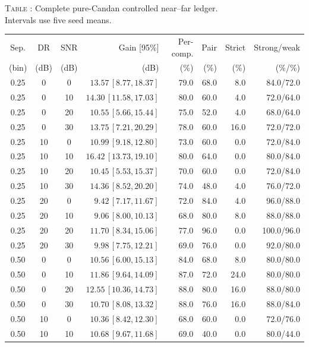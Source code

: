 \begingroup
\scriptsize
\setlength{\tabcolsep}{3.0pt}
\label{tab:supp_stress_cells}
\begin{center}
\textsc{Table \thetable}: Complete pure-Candan controlled near--far ledger.\\
Intervals use five seed means.\par\smallskip
\begin{tabular}{cccrrrrr}
\toprule
Sep. & DR & SNR & Gain [95\%] & Per-comp. & Pair & Strict & Strong/weak \\
(bin) & (dB) & (dB) & (dB) & (\%) & (\%) & (\%) & (\%/\%) \\
\midrule
0.25 & 0 & 0 & $13.57\,[8.77,18.37]$ & 79.0 & 68.0 & 8.0 & 84.0/72.0 \\
0.25 & 0 & 10 & $14.30\,[11.58,17.03]$ & 80.0 & 60.0 & 4.0 & 72.0/64.0 \\
0.25 & 0 & 20 & $10.55\,[5.66,15.44]$ & 75.0 & 52.0 & 4.0 & 68.0/64.0 \\
0.25 & 0 & 30 & $13.75\,[7.21,20.29]$ & 78.0 & 60.0 & 16.0 & 72.0/72.0 \\
0.25 & 10 & 0 & $10.99\,[9.18,12.80]$ & 73.0 & 60.0 & 0.0 & 72.0/84.0 \\
0.25 & 10 & 10 & $16.42\,[13.73,19.10]$ & 80.0 & 64.0 & 0.0 & 80.0/84.0 \\
0.25 & 10 & 20 & $10.45\,[5.53,15.37]$ & 70.0 & 60.0 & 0.0 & 72.0/84.0 \\
0.25 & 10 & 30 & $14.36\,[8.52,20.20]$ & 74.0 & 48.0 & 4.0 & 76.0/72.0 \\
0.25 & 20 & 0 & $9.42\,[7.17,11.67]$ & 72.0 & 84.0 & 4.0 & 96.0/88.0 \\
0.25 & 20 & 10 & $9.06\,[8.00,10.13]$ & 68.0 & 80.0 & 8.0 & 88.0/88.0 \\
0.25 & 20 & 20 & $11.70\,[8.34,15.06]$ & 77.0 & 96.0 & 0.0 & 100.0/96.0 \\
0.25 & 20 & 30 & $9.98\,[7.75,12.21]$ & 69.0 & 76.0 & 0.0 & 92.0/80.0 \\
0.50 & 0 & 0 & $10.56\,[6.00,15.13]$ & 84.0 & 68.0 & 8.0 & 80.0/80.0 \\
0.50 & 0 & 10 & $11.86\,[9.64,14.09]$ & 87.0 & 72.0 & 24.0 & 80.0/80.0 \\
0.50 & 0 & 20 & $12.55\,[10.36,14.73]$ & 88.0 & 80.0 & 16.0 & 88.0/80.0 \\
0.50 & 0 & 30 & $10.70\,[8.08,13.32]$ & 88.0 & 76.0 & 16.0 & 88.0/84.0 \\
0.50 & 10 & 0 & $10.36\,[8.42,12.30]$ & 68.0 & 60.0 & 0.0 & 72.0/76.0 \\
0.50 & 10 & 10 & $10.68\,[9.67,11.68]$ & 69.0 & 40.0 & 0.0 & 80.0/44.0 \\

\end{tabular}
\end{center}
